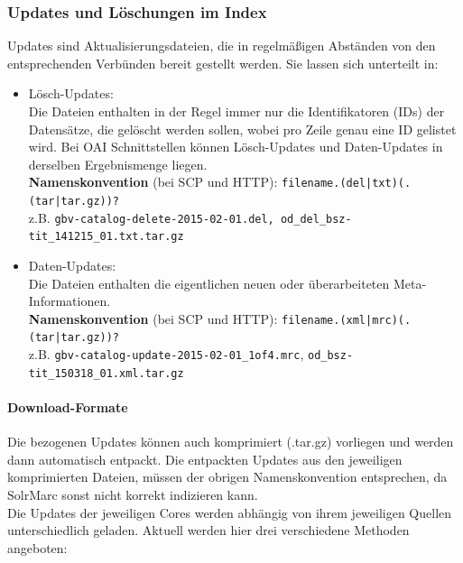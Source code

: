 \documentclass[10pt]{article}
\begin{document}
\subsubsection{Updates und Löschungen im Index}
\label{sec:subsub:Updates}
Updates sind Aktualisierungsdateien, die in regelmäßigen Abständen von den entsprechenden Verbünden bereit gestellt werden. Sie lassen sich unterteilt in: 
\begin{itemize}
	\item Lösch-Updates: \\
		Die Dateien enthalten in der Regel immer nur die Identifikatoren (IDs) der Datensätze, die gelöscht werden sollen, wobei pro Zeile genau eine ID gelistet wird. Bei OAI Schnittstellen können Lösch-Updates und Daten-Updates in derselben Ergebnismenge liegen. \\
		\textbf{Namenskonvention} (bei SCP und HTTP): \texttt{filename.(del|txt)(.(tar|tar.gz))?} \\ 
		z.B. \texttt{gbv-catalog-delete-2015-02-01.del, \texttt{od\_del\_bsz-tit\_141215\_01.txt.tar.gz}}
	\item Daten-Updates: \\
		Die Dateien enthalten die eigentlichen neuen oder überarbeiteten Meta-Informationen. \\
		\textbf{Namenskonvention} (bei SCP und HTTP): \texttt{filename.(xml|mrc)(.(tar|tar.gz))?} \\
		z.B. \texttt{gbv-catalog-update-2015-02-01\_1of4.mrc}, \texttt{od\_bsz-tit\_150318\_01.xml.tar.gz}
\end{itemize}

\paragraph{Download-Formate}
Die bezogenen Updates können auch komprimiert (.tar.gz) vorliegen und werden dann automatisch entpackt. Die entpackten Updates aus den jeweiligen komprimierten Dateien, müssen der obrigen Namenskonvention entsprechen, da SolrMarc sonst nicht korrekt indizieren kann. \\
Die Updates der jeweiligen Cores werden abhängig von ihrem jeweiligen Quellen unterschiedlich geladen. Aktuell werden hier drei verschiedene Methoden angeboten: 
\end{document}

